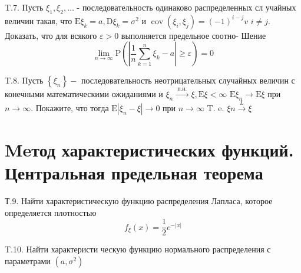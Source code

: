 \documentclass[a4paper,12pt]{article} %
\begin{document}
\begin{example}

T.7. Пусть $\xi_{1}, \xi_{2}, \ldots$ - последовательность одинаково распределенных сл учайных величин такая, что $\mathrm{E} \xi_{k}=a, \mathrm{D} \xi_{k}=\sigma^{2}$ и $\operatorname{cov}\left(\xi_{i}, \xi_{j}\right)=(-1)^{i-j} v$
$i \neq j .$ Доказать, что для всякого $\varepsilon>0$ выполняется предельное соотно-
Шение
$$
\lim _{n \rightarrow \infty} \mathrm{P}\left(\left|\frac{1}{n} \sum_{k=1}^{n} \xi_{k}-a\right| \geq \varepsilon\right)=0
$$




\end{example}





\begin{example}


T.8. Пусть $\left\{\xi_{n}\right\}-$ последовательность неотрицательных случайных величин с конечными математическими ожиданиями и $\xi_{n} \stackrel{\text { п.н. }}{\rightarrow} \xi, \mathrm{E} \xi<\infty$ $\mathrm{E} \xi_{n} \rightarrow \mathrm{E} \xi$ при $n \rightarrow \infty .$ Покажите, что тогда $\mathrm{E}\left|\xi_{n}-\xi\right| \rightarrow 0$ при $n \rightarrow \infty$
T. e. $\xi n \stackrel{L}{\rightarrow} \xi$



\end{example}



\section{Meтод характеристических функций. Центральная предельная теорема}



\begin{example}


Т.9. Найти характеристическую функцию распределения Лапласа, которое определяется плотностью
$$
f_{\xi}(x)=\frac{1}{2} e^{-|x|}
$$





\end{example}



\begin{example}

T.10. Найти характеристи ческую функцию нормального распределения с параметрами $\left(a, \sigma^{2}\right)$




\end{example}
\end{document}
